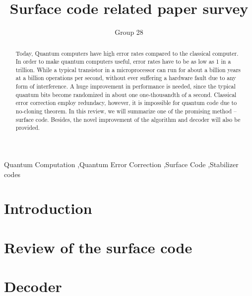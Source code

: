 \documentclass[final,5p,times,twocolumn,authoryear]{elsarticle}
\begin{document}
\begin{frontmatter}

    \title{Surface code related paper survey}

    \author{Group 28}

    \begin{abstract}
        Today, Quantum computers have high error rates compared to the classical computer. In order to make quantum computers useful, error rates have to be as low as 1 in a trillion. While a typical transistor in a microprocessor can run for about a billion years at a billion operations per second, without ever suffering a hardware fault due to any form of interference. A huge improvement in performance is needed, since the typical quantum bits become randomized in about one one-thousandth of a second. Classical error correction employ redundacy, however, it is impossible for quantum code due to no-cloning theorem. In this review, we will summarize one of the promising method – surface code. Besides, the novel improvement of the algorithm and decoder will also be provided.
    \end{abstract}

    \begin{keyword}
        Quantum Computation \sep Quantum Error Correction \sep Surface Code \sep Stabilizer codes
    \end{keyword}


\end{frontmatter}




\section{Introduction}
\label{introduction}


\section{Review of the surface code}
\label{review}


\section{Decoder}
\label{decoder}

\end{document}
